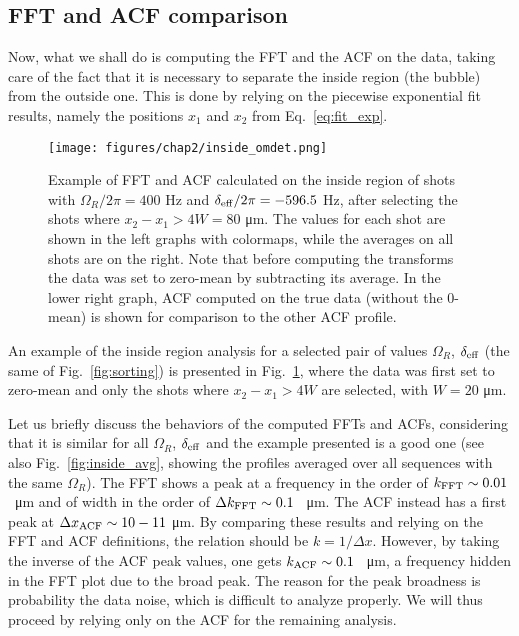 \subsection{FFT and ACF comparison}
Now, what we shall do is computing the FFT and the ACF on the data, taking care of the fact that it is necessary to separate the inside region (the bubble) from the outside one. This is done by relying on the piecewise exponential fit results, namely the positions $x_1$ and $x_2$ from Eq.\ \eqref{eq:fit_exp}.
\begin{figure}[ht!]
    \centering
    \texttt{[image: figures/chap2/inside\_omdet.png]}
    \caption{Example of FFT and ACF calculated on the inside region of shots with $\Omega_R/2\pi = 400$ \unit{\hertz} and $\delta_{\rm eff}/2\pi = -596.5$ \unit{\hertz}, after selecting the shots where $x_2-x_1 > 4W = 80$ \unit{\micro\meter}. The values for each shot are shown in the left graphs with colormaps, while the averages on all shots are on the right. Note that before computing the transforms the data was set to zero-mean by subtracting its average. In the lower right graph, ACF computed on the true data (without the 0-mean) is shown for comparison to the other ACF profile.}
    \label{fig:inside_00}
\end{figure}
An example of the inside region analysis for a selected pair of values $\Omega_R$, $\delta_{\rm eff}$ (the same of Fig.\ \ref{fig:sorting}) is presented in Fig.\ \ref{fig:inside_00}, where the data was first set to zero-mean and only the shots where $x_2-x_1 > 4W$ are selected, with $W = 20$ \unit{\micro\meter}.

Let us briefly discuss the behaviors of the computed FFTs and ACFs, considering that it is similar for all $\Omega_R$, $\delta_{\rm eff}$ and the example presented is a good one (see also Fig.\ \ref{fig:inside_avg}, showing the profiles averaged over all sequences with the same $\Omega_R$). The FFT shows a peak at a frequency in the order of $k_{\rm FFT} \sim 0.01$ \unit{\per\micro\meter} and of width in the order of $\Delta k_{\rm FFT} \sim 0.1$ \unit{\per\micro\meter}. The ACF instead has a first peak at $\Delta x_{\rm ACF} \sim 10-11$ \unit{\micro\meter}. By comparing these results and relying on the FFT and ACF definitions, the relation should be $k = 1/\Delta x$. However, by taking the inverse of the ACF peak values, one gets $k_{\rm ACF} \sim 0.1$ \unit{\per\micro\meter}, a frequency hidden in the FFT plot due to the broad peak. The reason for the peak broadness is probability the data noise, which is difficult to analyze properly. We will thus proceed by relying only on the ACF for the remaining analysis.

